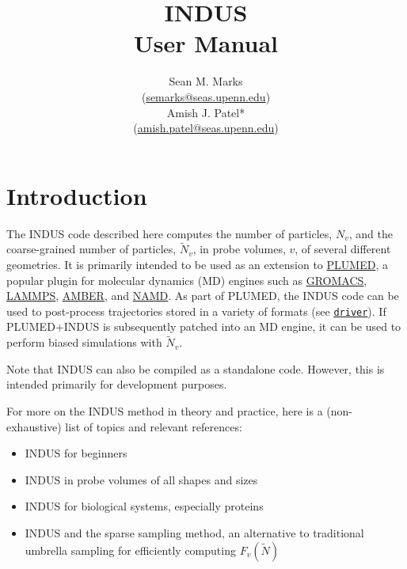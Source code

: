\documentclass[11pt,notitlepage]{article}
\newcommand{\email}[1]{\href{mailto:{#1}}{{#1}}}
\newcommand{\PLUMED}{\href{http://www.plumed.org/}{PLUMED}}
\newcommand{\plumeddoc}{https://plumed.github.io/doc-v2.4/user-doc/html}
\newcommand{\driver}{\href{\plumeddoc/driver.html}{\texttt{driver}}}
\newcommand{\GROMACS}{\href{http://www.gromacs.org/}{GROMACS}}
\newcommand{\LAMMPS}{\href{https://lammps.sandia.gov/}{LAMMPS}}
\newcommand{\AMBER}{\href{http://ambermd.org/}{AMBER}}
\newcommand{\NAMD}{\href{https://www.ks.uiuc.edu/Research/namd/}{NAMD}}
\begin{document}
	
\renewcommand\Affilfont{\itshape\small}
	
\title{INDUS\\User Manual}
\author{Sean M. Marks\\(\email{semarks@seas.upenn.edu})\\Amish J. Patel*\\(\email{amish.patel@seas.upenn.edu})}
	

\maketitle
\tableofcontents


\section{Introduction}

The INDUS code described here computes the number of particles, $N_v$, and the coarse-grained number of particles, $\tilde{N}_v$, in probe volumes, $v$, of several different geometries. It is primarily intended to be used as an extension to \PLUMED, a popular plugin for molecular dynamics (MD) engines such as \GROMACS, \LAMMPS, \AMBER, and \NAMD. As part of PLUMED, the INDUS code can be used to post-process trajectories stored in a variety of formats (see \driver). If PLUMED+INDUS is subsequently patched into an MD engine, it can be used to perform biased simulations with $\tilde{N}_v$.

Note that INDUS can also be compiled as a standalone code. However, this is intended primarily for development purposes.

For more on the INDUS method in theory and practice, here is a (non-exhaustive) list of topics and relevant references:
\begin{itemize}
	\item INDUS for beginners \cite{Patel2010}
	\item INDUS in probe volumes of all shapes and sizes \cite{Patel2011}
	\item INDUS for biological systems, especially proteins \cite{Patel2012,Patel2014}
	\item INDUS and the sparse sampling method, an alternative to traditional umbrella sampling for efficiently computing $F_v(\tilde{N})$ \cite{Xi2016,Xi2018}
\end{itemize}
\end{document}
